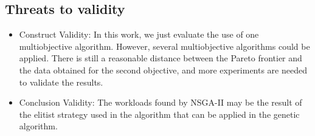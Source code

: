 \subsection{Threats to validity}
\begin{itemize}
\item Construct Validity: 
In this work, we just evaluate the use of one multiobjective algorithm. However, several multiobjective algorithms could be applied.  There is still a reasonable distance between the Pareto frontier and the data obtained for the second objective, and more experiments are needed to validate the results.
\item Conclusion Validity: 
The workloads found by NSGA-II may be the result of the elitist strategy used in the algorithm that can be applied in the genetic algorithm.
\end{itemize}

